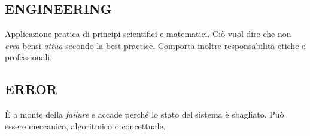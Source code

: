 		\subsection{ENGINEERING}  \label{engineering}
		Applicazione pratica di principi scientifici e matematici. Ciò vuol dire che non \textit{crea} bensì \textit{attua} secondo la \underline{\hyperref[best]{best practice}}. Comporta inoltre responsabilità etiche e professionali.
		
		\subsection{ERROR}		\label{error}
		È a monte della \textit{failure} e accade perché lo stato del sistema è sbagliato. Può essere meccanico, algoritmico o concettuale.
	
	
